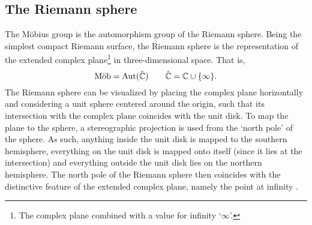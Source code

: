 \subsection{The Riemann sphere}
The Möbius group \moebiusgroup is the automorphism group of the Riemann sphere. Being the simplest compact Riemann surface, the Riemann sphere is the representation of the extended complex plane\footnote{The complex plane combined with a value for infinity `\(\infty\)'.}  in three-dimensional space. That is, 
\[ \moebiusgroup = \automorphgroup{\hat{\complex}} \qquad \hat{\complex} = \complex \cup \{\infty\}.\]
The Riemann sphere can be visualized by placing the complex plane horizontally and considering a unit sphere centered around the origin, such that its intersection with the complex plane coincides with the unit disk. To map the plane to the sphere, a stereographic projection is used from the `north pole' of the sphere. As such, anything inside the unit disk is mapped to the southern hemisphere, everything on the unit disk is mapped onto itself (since it lies at the intersection) and everything outside the unit disk lies on the northern hemisphere. The north pole of the Riemann sphere then coincides with the distinctive feature of the extended complex plane, namely the point at infinity \cite{Needham1997}.

